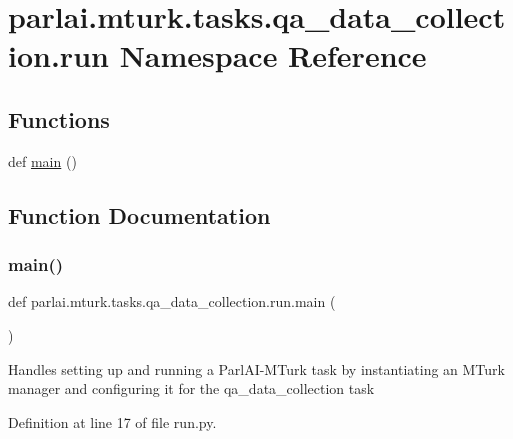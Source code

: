 \hypertarget{namespaceparlai_1_1mturk_1_1tasks_1_1qa__data__collection_1_1run}{}\section{parlai.\+mturk.\+tasks.\+qa\+\_\+data\+\_\+collection.\+run Namespace Reference}
\label{namespaceparlai_1_1mturk_1_1tasks_1_1qa__data__collection_1_1run}
\subsection*{Functions}
\begin{DoxyCompactItemize}
\item 
def \hyperlink{namespaceparlai_1_1mturk_1_1tasks_1_1qa__data__collection_1_1run_a461bad0b4f8f16a8ea54e7231ad8848b}{main} ()
\end{DoxyCompactItemize}


\subsection{Function Documentation}
\mbox{\label{namespaceparlai_1_1mturk_1_1tasks_1_1qa__data__collection_1_1run_a461bad0b4f8f16a8ea54e7231ad8848b}} 
\subsubsection{\texorpdfstring{main()}{main()}}
{\footnotesize\ttfamily def parlai.\+mturk.\+tasks.\+qa\+\_\+data\+\_\+collection.\+run.\+main (\begin{DoxyParamCaption}{ }\end{DoxyParamCaption})}

\begin{DoxyVerb}Handles setting up and running a ParlAI-MTurk task by instantiating
an MTurk manager and configuring it for the qa_data_collection task
\end{DoxyVerb}
 

Definition at line 17 of file run.\+py.

